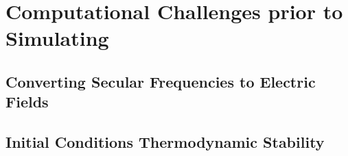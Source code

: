 \chapter{Computational Challenges prior to Simulating}\label{computational-challenges}


\section{Converting Secular Frequencies to Electric Fields}\label{converting-secular-frequencies-to-electric-fields}

\section{Initial Conditions Thermodynamic Stability}\label{initial-conditions-thermodynamic-stability}
